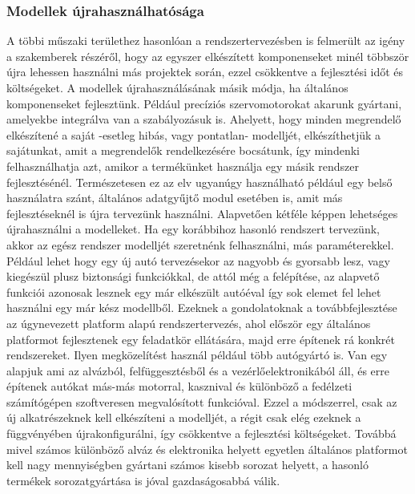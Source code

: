         \subsubsection{Modellek újrahasználhatósága}
        A többi műszaki területhez hasonlóan a rendszertervezésben is felmerült az igény a szakemberek részéről, hogy az egyszer elkészített komponenseket minél többször újra lehessen használni más projektek során, ezzel csökkentve a fejlesztési időt és költségeket.
        A modellek újrahasználásának másik módja, ha általános komponenseket fejlesztünk. Például precíziós szervomotorokat akarunk gyártani, amelyekbe integrálva van a szabályozásuk is. Ahelyett, hogy minden megrendelő elkészítené a saját -esetleg hibás, vagy pontatlan- modelljét, elkészíthetjük a sajátunkat, amit a megrendelők rendelkezésére bocsátunk, így mindenki felhasználhatja azt, amikor a termékünket használja egy másik rendszer fejlesztésénél.
        Természetesen ez az elv ugyanúgy használható például egy belső használatra szánt, általános adatgyűjtő modul esetében is, amit más fejlesztéseknél is újra tervezünk használni.
        Alapvetően kétféle képpen lehetséges újrahasználni a modelleket. Ha egy korábbihoz hasonló rendszert tervezünk, akkor az egész rendszer modelljét szeretnénk felhasználni, más paraméterekkel. Például lehet hogy egy új autó tervezésekor az nagyobb és gyorsabb lesz, vagy kiegészül plusz biztonsági funkciókkal, de attól még a felépítése, az alapvető funkciói azonosak lesznek egy már elkészült autóéval így sok elemet fel lehet használni egy már kész modellből.
        Ezeknek a gondolatoknak a továbbfejlesztése az úgynevezett platform alapú rendszertervezés, ahol először egy általános platformot fejlesztenek egy feladatkör ellátására, majd erre építenek rá konkrét rendszereket. Ilyen megközelítést használ például több autógyártó is. Van egy alapjuk ami az alvázból, felfüggesztésből és a vezérlőelektronikából áll, és erre építenek autókat más-más motorral, kasznival és különböző a fedélzeti számítógépen szoftveresen megvalósított funkcióval.
        Ezzel a módszerrel, csak az új alkatrészeknek kell elkészíteni a modelljét, a régit csak elég ezeknek a függvényében újrakonfigurálni, így csökkentve a fejlesztési költségeket. Továbbá mivel számos különböző alváz és elektronika helyett egyetlen általános platformot kell nagy mennyiségben gyártani számos kisebb sorozat helyett, a hasonló termékek sorozatgyártása is jóval gazdaságosabbá válik.
        
